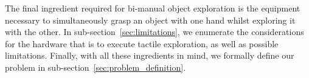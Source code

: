 The final ingredient required for bi-manual object exploration is the equipment necessary to simultaneously grasp an object with one hand whilst exploring it with the other. In sub-section~\ref{sec:limitations}, we enumerate the considerations for the hardware that is to execute tactile exploration, as well as possible limitations. Finally, with all these ingredients in mind, we formally define our problem in sub-section~\ref{sec:problem_definition}.






